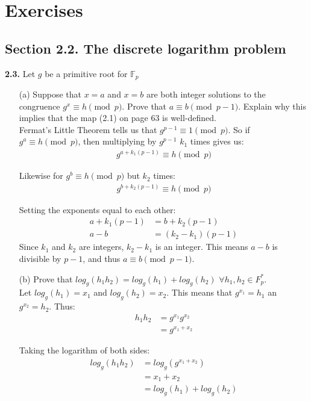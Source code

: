 \documentclass[11pt,fleqn]{article}
\newcommand{\F}{\mathbb{F}}
\begin{document}
\section*{Exercises}

\subsection*{Section 2.2. The discrete logarithm problem}

\textbf{2.3.} Let $g$ be a primitive root for $\F_{p}$
\begin{itemize}
\item[(a)] Suppose that $x = a$ and $x = b$ are both integer solutions to the congruence $g^x \equiv h \pmod{p}$. Prove that $a \equiv b \pmod{p-1}$. Explain why this implies that the map (2.1) on page 63 is well-defined. \\
Fermat's Little Theorem tells us that $g^{p-1} \equiv 1 \pmod{p}$.  So if $g^a \equiv h \pmod{p}$, then multiplying by $g^{p-1}$ $k_1$ times gives us:
\begin{align}
  g^{a + k_1(p-1)} \equiv h \pmod{p}
\end{align}

Likewise for $g^b \equiv h \pmod{p}$ but $k_2$ times:
\begin{align}
  g^{b + k_2(p-1)} \equiv h \pmod{p}
\end{align}

Setting the exponents equal to each other:
\begin{align}
  a + k_1(p-1) &= b + k_2(p-1)\\
  a - b &= (k_2 - k_1)(p-1)
\end{align}
Since $k_1$ and $k_2$ are integers, $k_2 - k_1$ is an integer.  This means $a-b$ is divisible by $p-1$, and thus $a \equiv b \pmod{p-1}$.

\item[(b)] Prove that $log_g (h_1 h_2) = log_g (h_1) + log_g (h_2)$ $\forall h_1, h_2 \in F_p^*$.\\
  Let $log_g (h_1) = x_1$ and $log_g (h_2) = x_2$.  This means that $g^{x_1} = h_1$ an $g^{x_2} = h_2$.  Thus:
\begin{align}
  h_1 h_2 &= g^{x_1} g^{x_2}\\
          &= g^{x_1 + x_2}
\end{align}

Taking the logarithm of both sides:
\begin{align}
  log_g (h_1 h_2) &= log_g (g^{x_1 + x_2})\\
  &= x_1 + x_2\\
  &= log_g (h_1) + log_g (h_2)
\end{align}


\end{itemize}
\end{document}
